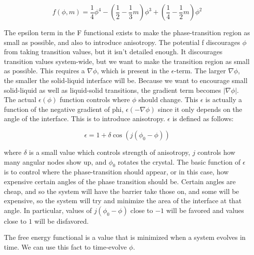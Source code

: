 \documentclass[10pt]{article} %
\begin{document}
\begin{equation}
  f(\phi,m) = \frac{1}{4}\phi^4 - (\frac{1}{2} - \frac{1}{3}m)\phi^3 + (\frac{1}{4}-\frac{1}{2}m)\phi^2
\end{equation}

The epsilon term in the F functional exists to make the phase-transition region as small as possible, and also to introduce anisotropy. The potential f discourages $\phi$ from taking transition values, but it isn't detailed enough. It discourages transition values system-wide, but we want to make the transition region as small as possible. This requires a $\nabla\phi$, which is present in the $\epsilon$-term. The larger $\nabla\phi$, the smaller the solid-liquid interface will be. Because we want to encourage small solid-liquid as well as liquid-solid transitions, the gradient term becomes $|\nabla\phi|$. The actual $\epsilon(\phi)$ function controls where $\phi$ should change. This $\epsilon$ is actually a function of the negative gradient of phi, $\epsilon(-\nabla\phi)$ since it only depends on the angle of the interface. This is to introduce anisotropy. $\epsilon$ is defined as follows:

\begin{equation}
  \epsilon = 1 + \delta\cos(j(\phi_0-\phi))
\end{equation}

where $\delta$ is a small value which controls strength of anisotropy, $j$ controls how many angular nodes show up, and $\phi_0$ rotates the crystal. The basic function of $\epsilon$ is to control where the phase-transition should appear, or in this case, how expensive certain angles of the phase transition should be. Certain angles are cheap, and so the system will have the barrier take those on, and some will be expensive, so the system will try and minimize the area of the interface at that angle. In particular, values of $j(\phi_0-\phi)$ close to $-1$ will be favored and values close to $1$ will be disfavored.

The free energy functional is a value that is minimized when a system evolves in time. We can use this fact to time-evolve $\phi$.
\end{document}
